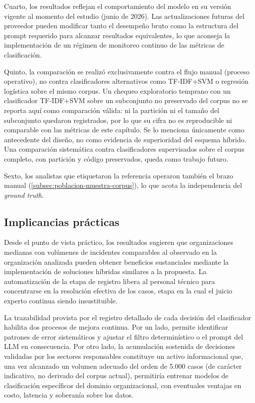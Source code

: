 Cuarto, los resultados reflejan el comportamiento del modelo en su versión vigente al momento del estudio (junio de 2026). Las actualizaciones futuras del proveedor pueden modificar tanto el desempeño bruto como la estructura del prompt requerido para alcanzar resultados equivalentes, lo que aconseja la implementación de un régimen de monitoreo continuo de las métricas de clasificación.

Quinto, la comparación se realizó exclusivamente contra el flujo manual (proceso operativo), no contra clasificadores alternativos como TF-IDF+SVM o regresión logística sobre el mismo corpus. Un chequeo exploratorio temprano con un clasificador TF-IDF+SVM sobre un subconjunto no preservado del corpus no se reporta aquí como comparación válida: ni la partición ni el tamaño del subconjunto quedaron registrados, por lo que su cifra no es reproducible ni comparable con las métricas de este capítulo. Se lo menciona únicamente como antecedente del diseño, no como evidencia de superioridad del esquema híbrido. Una comparación sistemática contra clasificadores supervisados sobre el corpus completo, con partición y código preservados, queda como trabajo futuro.

Sexto, los analistas que etiquetaron la referencia operaron también el brazo manual (\autoref{subsec:poblacion-muestra-corpus}), lo que acota la independencia del \emph{ground truth}.

\subsection{Implicancias prácticas}\label{subsec:implicancias-practicas}

Desde el punto de vista práctico, los resultados sugieren que organizaciones medianas con volúmenes de incidentes comparables al observado en la organización analizada pueden obtener beneficios sustanciales mediante la implementación de soluciones híbridas similares a la propuesta. La automatización de la etapa de registro libera al personal técnico para concentrarse en la resolución efectiva de los casos, etapa en la cual el juicio experto continua siendo insustituible.

La trazabilidad provista por el registro detallado de cada decisión del clasificador habilita dos procesos de mejora continua. Por un lado, permite identificar patrones de error sistemáticos y ajustar el filtro determinístico o el prompt del LLM en consecuencia. Por otro lado, la acumulación sostenida de decisiones validadas por los sectores responsables constituye un activo informacional que, una vez alcanzado un volumen adecuado del orden de 5.000 casos (de carácter indicativo, no derivado del corpus actual), permitiría entrenar modelos de clasificación específicos del dominio organizacional, con eventuales ventajas en costo, latencia y soberanía sobre los datos.

